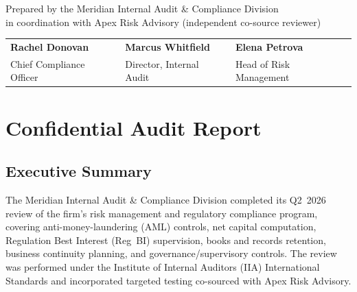 \documentclass[11pt,a4paper]{scrreprt}
\begin{document}
\begin{titlepage}
\vfill

\begin{center}
{\small\color{auditslate} Prepared by the Meridian Internal Audit \& Compliance Division\\
in coordination with Apex Risk Advisory (independent co-source reviewer)}
\end{center}

\vspace{0.6cm}
\begin{center}
\renewcommand{\arraystretch}{1.3}
\begin{tabular}{p{4.2cm}p{4.2cm}p{4.2cm}}
\centering\footnotesize\textbf{Rachel Donovan} & \centering\footnotesize\textbf{Marcus Whitfield} & \centering\footnotesize\textbf{Elena Petrova}\tabularnewline
\centering\scriptsize Chief Compliance Officer & \centering\scriptsize Director, Internal Audit & \centering\scriptsize Head of Risk Management\tabularnewline
\end{tabular}
\end{center}
\end{titlepage}

\chapter*{Confidential Audit Report}

\section*{Executive Summary}

The Meridian Internal Audit \& Compliance Division completed its Q2~2026 review of the firm's
risk management and regulatory compliance program, covering anti-money-laundering (AML)
controls, net capital computation, Regulation Best Interest (Reg~BI) supervision, books and
records retention, business continuity planning, and governance/supervisory controls. The
review was performed under the Institute of Internal Auditors (IIA) International Standards
and incorporated targeted testing co-sourced with Apex Risk Advisory.
\end{document}
